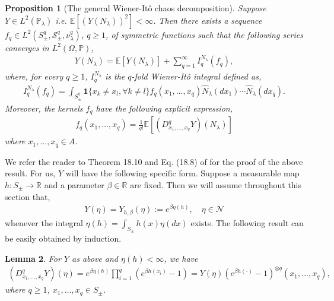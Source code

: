 \documentclass[a4paper, 11pt, reqno]{amsart}
\theoremstyle{definition} \newtheorem{defn}{Definition}[section]
\theoremstyle{remark} \newtheorem{rem}[defn]{Remark}
\theoremstyle{remark} \newtheorem*{rem*}{Remark}
\theoremstyle{plain} \newtheorem{thm}[defn]{Theorem}
\theoremstyle{plain} \newtheorem{lem}[defn]{Lemma}
\theoremstyle{plain} \newtheorem{prop}[defn]{Proposition}
\theoremstyle{plain} \newtheorem{cor}[defn]{Corollary}
\theoremstyle{remark} \newtheorem{exm}[defn]{\textbf{Example}}
\theoremstyle{remark} \newtheorem{exms}[defn]{\textbf{Examples}}
\theoremstyle{remark} \newtheorem*{bl}{}
\numberwithin{equation}{section} %
\newcommand{\mc}{\mathcal}
\newcommand{\R}{\mathbb{R}}
\newcommand{\pr}{\mathbb{P}}
\newcommand{\E}{\mathbb{E}}
\newcommand{\ind}{\mathbf{1}}
\begin{document}
	\begin{prop}[The general Wiener-It\^{o} chaos decomposition] \label{prop:wi_chaos_poisson}
		 Suppose $Y \in L^2(\pr_{\lambda})$ i.e. $\E[(Y(N_{\lambda}))^2] < \infty$. Then there exists a sequence $f_q \in L^2(S_{\pm}^q, \mc{S}_{\pm}^q, \nu_{\lambda}^q)$, $q \ge 1$, of symmetric functions such that the following series converges in $L^2(\Omega, \pr)$,
		\begin{align}\label{eq:chaos_exp_PRM_gen}
			Y(N_{\lambda}) = \E [Y(N_{\lambda})] + \sum_{q=1}^{\infty} I^{N_{\lambda}}_q (f_q),
		\end{align} 
		where, for every $q \ge 1$, $I^{N_{\lambda}}_q$ is the $q$-fold Wiener-It\^{o} integral defined as,
		\begin{align}\label{eq:chaos_exp_PRM_gen_1}
			I^{N_{\lambda}}_q (f_q) = \int_{S_{\pm}^q} \ind\{ x_k \neq x_l, \forall k \neq l\} f_q(x_1, \ldots, x_q) \hat{N}_{\lambda}(dx_1)\cdots\hat{N}_{\lambda}(dx_q).
		\end{align}
        Moreover, the kernels $f_q$ have the following explicit expression,
        \begin{align}\label{eq:fq_diff_op}
			f_q(x_1, \ldots, x_q) = \frac{1}{q!} \E [(D^q_{x_1, \ldots, x_q} Y) (N_{\lambda})]
		\end{align}
		where $x_1, \ldots, x_q \in A$.
	\end{prop}
 
    We refer the reader to Theorem 18.10 and Eq. (18.8) of \cite{lp18} for the proof of the above result.
    For us, $Y$ will have the following specific form. Suppose a measurable map $h : S_{\pm} \to \R$ and a parameter $\beta \in \R$ are fixed. Then we will assume throughout this section that,
	\begin{align}
		Y(\eta) = Y_{h, \beta} (\eta) := e^{\beta \eta (h)}, \quad \eta \in \mc{N}
	\end{align}
	whenever the integral $\eta(h) = \int_{S_{\pm}} h(x) \eta (dx)$ exists. The following result can be easily obtained by induction.
	\begin{lem}
		For $Y$ as above and $\eta(h) < \infty$, we have
		\begin{align}\label{eq:diff_op_exp}
			(D^q_{x_1, \ldots, x_q} Y ) (\eta) = e^{\beta \eta(h)} \prod_{i=1}^q (e^{\beta h(x_i)}-1) = Y(\eta) (e^{\beta h (\cdot)}-1)^{\otimes q} (x_1, \ldots, x_q),
		\end{align}
		where $q \ge 1$, $x_1, \ldots, x_q \in S_{\pm}$.
	\end{lem}
 
\end{document}
